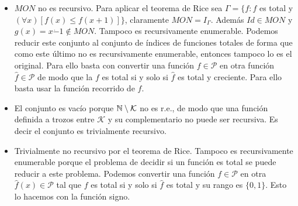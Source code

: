 \documentclass[twoside]{article}
\begin{document}
\begin{solucion}
\begin{itemize}
	\item $MON$ no es recursivo. Para aplicar el teorema de Rice sea $\Gamma=\{f: f$ es total y $(\forall x)[f(x)\leq f(x+1)]\}$, claramente $MON=I_\Gamma$. Además $Id\in MON$ y $g(x)=x\dot{-}1\notin MON$. Tampoco es recursivamente enumerable. Podemos reducir este conjunto al conjunto de índices de funciones totales de forma que como este último no es recursivamente enumerable, entonces tampoco lo es el original. Para ello basta con convertir una función $f\in\mathcal{P}$ en otra función $\hat{f}\in\mathcal{P}$ de modo que la $f$ es total si y solo si $\hat{f}$ es total y creciente. Para ello basta usar la función recorrido de $f$. 
	\item El conjunto es vacío porque $\mathbb{N}\setminus\mathcal{K}$ no es r.e., de modo que una función definida a trozos entre $\mathcal{K}$ y su complementario no puede ser recursiva. Es decir el conjunto es trivialmente recursivo.
	\item Trivialmente no recursivo por el teorema de Rice. Tampoco es recursivamente enumerable porque el problema de decidir si un función es total se puede reducir a este problema. Podemos convertir una función $f\in\mathcal{P}$ en otra $\hat{f}(x)\in\mathcal{P}$ tal que $f$ es total si y solo si $\hat{f}$ es total y su rango es $\{0,1\}$. Esto lo hacemos con la función signo.
\end{itemize}
\end{solucion}

\newpage
\end{document}
